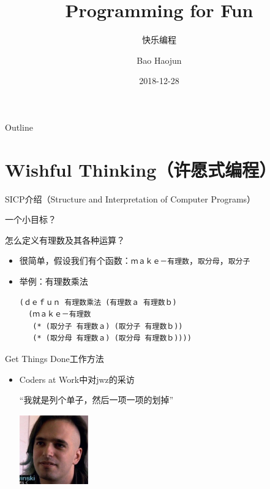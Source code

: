 \documentclass[presentation,dvipdfmx,CJKbookmarks]{beamer}
\author{Bao Haojun}
\date{2018-12-28}
\title{Programming for Fun}
\subtitle{快乐编程}
\begin{document}
\begin{CJK*}{UTF8}{simsun}

\maketitle
\begin{frame}{Outline}
\tableofcontents
\end{frame}

\CJKtilde

\section{Wishful Thinking（许愿式编程）}
\label{sec:org419b511}

\begin{frame}[fragile,label={sec:orgae65a75}]{SICP\thinspace 介绍（Structure and Interpretation of Computer Programs）}
 \begin{block}{一个小目标？}
\pause
\end{block}
\begin{block}{怎么定义有理数及其各种运算？}
\pause
\begin{itemize}[<+->]
\item 很简单，假设我们有\thinspace 个函数：\texttt{ｍａｋｅ－有理数}，\texttt{取分母}，\texttt{取分子}
\item 举例：有理数乘法

\begin{verbatim}
(ｄｅｆｕｎ 有理数乘法 (有理数ａ 有理数ｂ)
  (ｍａｋｅ－有理数
   (* (取分子 有理数ａ) (取分子 有理数ｂ))
   (* (取分母 有理数ａ) (取分母 有理数ｂ))))
\end{verbatim}
\end{itemize}
\end{block}
\end{frame}

\begin{frame}[label={sec:org98fd167}]{Get Things Done\thinspace 工作方法}
\pause
\begin{itemize}[<+->]
\item Coders at Work\thinspace 中对\thinspace jwz\thinspace 的采访

“我就是列个单子，然后一项一项的划掉”

\begin{center}
\includegraphics[width=3cm]{./jwz.ps}
\end{center}


\end{itemize}
\end{frame}
\end{CJK*}
\end{document}
